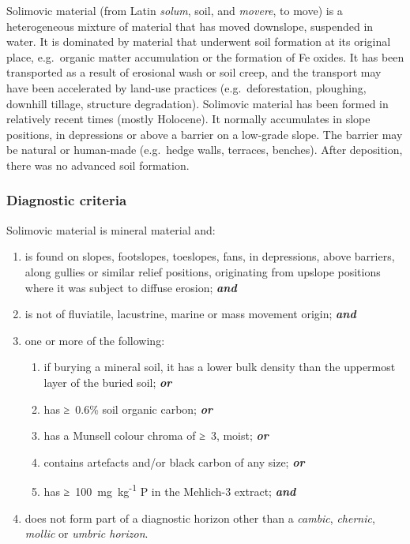 \documentclass[
  letterpaper,
  DIV=11,
  numbers=noendperiod]{scrreprt}
\providecommand{\tightlist}{%
  \setlength{\itemsep}{0pt}\setlength{\parskip}{0pt}}\usepackage{longtable,booktabs,array}
\begin{document}
Solimovic material (from Latin \emph{solum}, soil, and \emph{movere}, to
move) is a heterogeneous mixture of material that has moved downslope,
suspended in water. It is dominated by material that underwent soil
formation at its original place, e.g.~organic matter accumulation or the
formation of Fe oxides. It has been transported as a result of erosional
wash or soil creep, and the transport may have been accelerated by
land-use practices (e.g.~deforestation, ploughing, downhill tillage,
structure degradation). Solimovic material has been formed in relatively
recent times (mostly Holocene). It normally accumulates in slope
positions, in depressions or above a barrier on a low-grade slope. The
barrier may be natural or human-made (e.g.~hedge walls, terraces,
benches). After deposition, there was no advanced soil formation.

\hypertarget{diagnostic-criteria-73}{%
\subsubsection{Diagnostic criteria}\label{diagnostic-criteria-73}}

Solimovic material is mineral material and:

\begin{enumerate}
\def\labelenumi{\arabic{enumi}.}
\item
  is found on slopes, footslopes, toeslopes, fans, in depressions, above
  barriers, along gullies or similar relief positions, originating from
  upslope positions where it was subject to diffuse erosion;
  \textbf{\emph{and}}
\item
  is not of fluviatile, lacustrine, marine or mass movement origin;
  \textbf{\emph{and}}
\item
  one or more of the following:

  \begin{enumerate}
  \def\labelenumii{\alph{enumii}.}
  \tightlist
  \item
    if burying a mineral soil, it has a lower bulk density than the
    uppermost layer of the buried soil; \textbf{\emph{or}}
  \item
    has ≥~0.6\% soil organic carbon; \textbf{\emph{or}}
  \item
    has a Munsell colour chroma of ≥~3, moist; \textbf{\emph{or}}
  \item
    contains artefacts and/or black carbon of any size;
    \textbf{\emph{or}}
  \item
    has ≥~100~mg~kg\textsuperscript{-1} P in the Mehlich-3 extract;
    \textbf{\emph{and}}
  \end{enumerate}
\item
  does not form part of a diagnostic horizon other than a \emph{cambic},
  \emph{chernic}, \emph{mollic} or \emph{umbric horizon}.
\end{enumerate}
\end{document}
